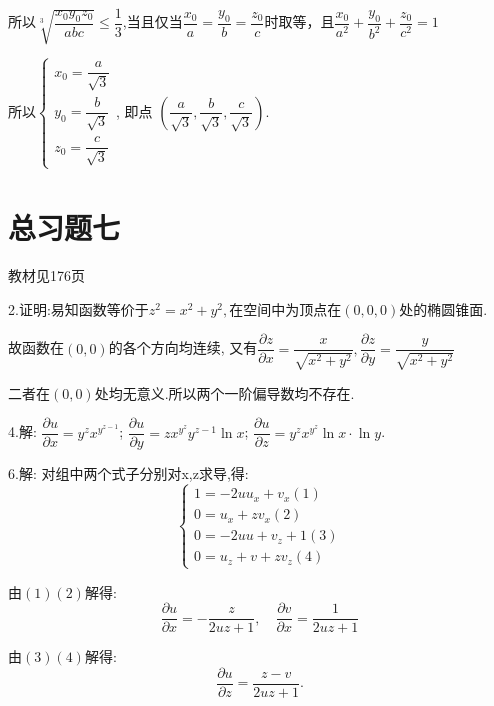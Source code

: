     所以$ \sqrt[3]{{\dfrac{{x_0y_0z_0}}{{abc}}}}\leq \dfrac{1}{3}$,当且仅当$\dfrac{x_0}{a} = \dfrac{y_0}{b} = \dfrac{z_0}{c}$时取等，且$\dfrac{x_0}{a^2}+\dfrac{y_0}{b^2}+\dfrac{z_0}{c^2}=1$

    所以$\begin{cases}x_0=\dfrac{a}{{\sqrt 3 }}\\y_0=\dfrac{b}{{\sqrt 3 }}\\z_0=\dfrac{c}{{\sqrt 3 }} \end{cases}$, 即点
    $\left(\dfrac{a}{\sqrt 3 },\dfrac{b}{\sqrt 3 },\dfrac{c}{\sqrt 3 }\right)$.

\section*{总习题七}
\begin{flushright}
  \color{zhanqing!80}
   教材见176页
\end{flushright}

  2.证明:易知函数等价于$ {z^2} = {x^2} + {y^2}, $在空间中为顶点在$ \left( {0,0,0} \right) $处的椭圆锥面.

  故函数在$ \left( {0,0} \right) $的各个方向均连续,
  又有$\dfrac{{\partial z}}{{\partial x}} = \dfrac{x}{{\sqrt {{x^2} + {y^2}} }},\dfrac{{\partial z}}{{\partial y}} = \dfrac{y}{{\sqrt {{x^2} + {y^2}} }}$

  二者在$ \left( {0,0} \right) $处均无意义.所以两个一阶偏导数均不存在.

  4.解:
  $\dfrac{{\partial u}}{{\partial x}} = {y^z}{x^{{y^{z - 1}}}}$; \qquad
  $\dfrac{{\partial u}}{{\partial y}} = z{x^{{y^z}}}{y^{z - 1}}\ln x$; \qquad
  $\dfrac{{\partial u}}{{\partial z}} = {y^z}{x^{{y^z}}}\ln x \cdot \ln y$.

  6.解: 对组中两个式子分别对x,z求导,得:
  \[\begin{cases}
  1 =  - 2u{u_x} + {v_x}\left( 1 \right)\\
  0 = {u_x} + z{v_x}\left( 2 \right) \\
  0 =  - 2uu + {v_z} + 1\left( 3 \right)\\
  0 = {u_z} + v + z{v_z}\left( 4 \right)
  \end{cases}\]

  由$ \left( 1 \right)\left( 2 \right) $解得:
  \[\dfrac{{\partial u}}{{\partial x}} =  - \dfrac{z}{{2uz + 1}}, \quad
  \dfrac{{\partial v}}{{\partial x}} = \dfrac{1}{{2uz + 1}}\]

  由$ \left( 3 \right)\left( 4 \right) $解得:
  \[\dfrac{{\partial u}}{{\partial z}} = \dfrac{{z - v}}{{2uz + 1}}.\]

